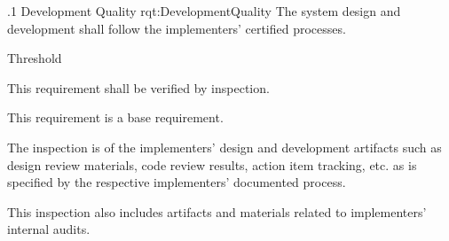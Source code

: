 \ONERQMT
{\RqtNumberBase.1}
{Development Quality}
{rqt:DevelopmentQuality}
{The system design and development shall follow the implementers' certified processes.}
{
	\item [Phase 1] Threshold
}
{This requirement shall be verified by inspection.}
{
	\item [N/A] This requirement is a base requirement.
}
{
	\item The inspection is of the implementers' design and development artifacts such as design review materials, code review results, action item tracking, etc. as is specified by the respective implementers' documented process.
	\item This inspection also includes artifacts and materials related to implementers' internal audits.
}

